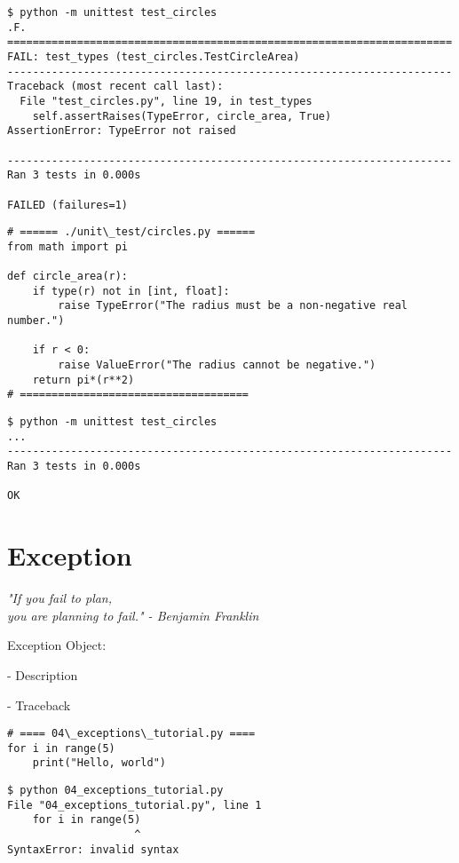 \documentclass{beamer}
\begin{document}
\begin{frame}[fragile]{}
\begin{verbatim}
$ python -m unittest test_circles   
.F.
======================================================================
FAIL: test_types (test_circles.TestCircleArea)
----------------------------------------------------------------------
Traceback (most recent call last):
  File "test_circles.py", line 19, in test_types
    self.assertRaises(TypeError, circle_area, True)
AssertionError: TypeError not raised

----------------------------------------------------------------------
Ran 3 tests in 0.000s

FAILED (failures=1)
\end{verbatim}
\end{frame}

\begin{frame}[fragile]{}
\begin{verbatim}
# ====== ./unit\_test/circles.py ======
from math import pi

def circle_area(r):
    if type(r) not in [int, float]:
        raise TypeError("The radius must be a non-negative real number.")

    if r < 0:
        raise ValueError("The radius cannot be negative.")
    return pi*(r**2)
# ====================================
\end{verbatim}
\begin{verbatim}
$ python -m unittest test_circles   
...
----------------------------------------------------------------------
Ran 3 tests in 0.000s

OK
\end{verbatim}
\end{frame}

\section{Exception}

\begin{frame}[fragile]{}
\textit{"If you fail to plan,\\
you are planning to fail." - Benjamin Franklin} \par \vspace{10pt}
Exception Object: \par
\hspace{1em}- Description\par
\hspace{1em}- Traceback
\begin{verbatim}
# ==== 04\_exceptions\_tutorial.py ====
for i in range(5)
    print("Hello, world")
\end{verbatim}
\begin{verbatim}
$ python 04_exceptions_tutorial.py
File "04_exceptions_tutorial.py", line 1
    for i in range(5)
                    ^
SyntaxError: invalid syntax
\end{verbatim}
\end{frame}
\end{document}
